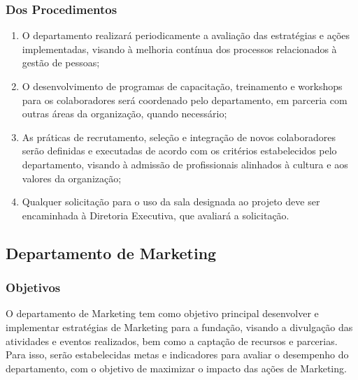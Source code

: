 {        \subsubsection{Dos Procedimentos}
            \begin{enumerate}
                \item O departamento realizará periodicamente a avaliação das estratégias e ações implementadas, visando à melhoria contínua dos processos relacionados à gestão de pessoas;
                \item O desenvolvimento de programas de capacitação, treinamento e workshops para os colaboradores será coordenado pelo departamento, em parceria com outras áreas da organização, quando necessário;
                \item As práticas de recrutamento, seleção e integração de novos colaboradores serão definidas e executadas de acordo com os critérios estabelecidos pelo departamento, visando à admissão de profissionais alinhados à cultura e aos valores da organização;
                \item Qualquer solicitação para o uso da sala designada ao projeto deve ser encaminhada à Diretoria Executiva, que avaliará a solicitação.
            \end{enumerate}
    }
   \subsection{Departamento de Marketing}
        \subsubsection{Objetivos}
            O departamento de Marketing tem como objetivo principal desenvolver e implementar estratégias de Marketing para a fundação, visando a divulgação das atividades e eventos realizados, bem como a captação de recursos e parcerias. Para isso, serão estabelecidas metas e indicadores para avaliar o desempenho do departamento, com o objetivo de maximizar o impacto das ações de Marketing.
